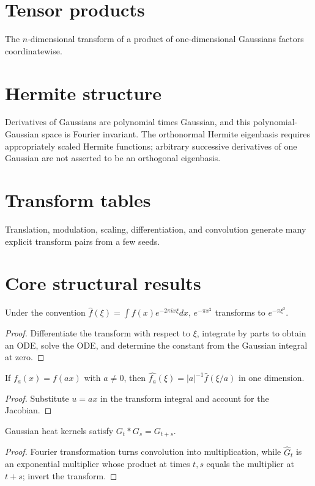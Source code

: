 \section{Tensor products}
The $n$-dimensional transform of a product of one-dimensional Gaussians factors coordinatewise.

\section{Hermite structure}
Derivatives of Gaussians are polynomial times Gaussian, and this polynomial-Gaussian space is Fourier invariant. The orthonormal Hermite eigenbasis requires appropriately scaled Hermite functions; arbitrary successive derivatives of one Gaussian are not asserted to be an orthogonal eigenbasis.

\section{Transform tables}
Translation, modulation, scaling, differentiation, and convolution generate many explicit transform pairs from a few seeds.

\section{Core structural results}

\begin{theorem}\label{thm:iii12-01}
Under the convention $\widehat f(\xi)=\int f(x)e^{-2\pi ix\xi}dx$, $e^{-\pi x^2}$ transforms to $e^{-\pi\xi^2}$.
\begin{proof}
Differentiate the transform with respect to $\xi$, integrate by parts to obtain an ODE, solve the ODE, and determine the constant from the Gaussian integral at zero.
\end{proof}
\end{theorem}

\begin{theorem}\label{thm:iii12-02}
If $f_a(x)=f(ax)$ with $a\ne0$, then $\widehat{f_a}(\xi)=|a|^{-1}\widehat f(\xi/a)$ in one dimension.
\begin{proof}
Substitute $u=ax$ in the transform integral and account for the Jacobian.
\end{proof}
\end{theorem}

\begin{theorem}\label{thm:iii12-03}
Gaussian heat kernels satisfy $G_t*G_s=G_{t+s}$.
\begin{proof}
Fourier transformation turns convolution into multiplication, while $\widehat G_t$ is an exponential multiplier whose product at times $t,s$ equals the multiplier at $t+s$; invert the transform.
\end{proof}
\end{theorem}

